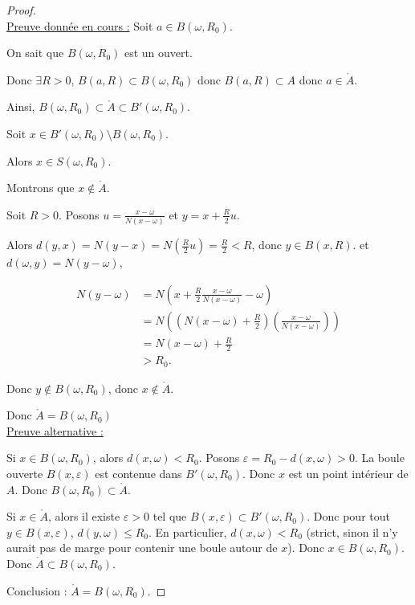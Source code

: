 \begin{proof}~\\
    \uline{Preuve donnée en cours :}
    Soit $a \in B(\omega, R_0)$. 

    On sait que $B(\omega, R_0)$ est un ouvert. 

    Donc $\exists R > 0, \, B(a, R) \subset B(\omega, R_0)$ 
    donc $B(a, R) \subset A$ donc $a \in \mathring{A}$.

    Ainsi, $B(\omega, R_0) \subset \mathring{A} \subset B'(\omega, R_0)$.

    Soit $x \in B'(\omega, R_0) \setminus B(\omega, R_0)$.

    Alors $x \in S(\omega, R_0)$. 

    Montrons que $x \not \in \mathring A$. 

    Soit $R > 0$. Posons $u = \frac{x - \omega}{N(x - \omega)}$ et $y = x + \frac R 2 u$.

    Alors $d(y, x) = N(y - x) = N\left( \frac R 2 u \right) = \frac R 2 < R$, donc $y \in B(x, R)$.
    et $d(\omega, y) = N(y - \omega)$, 

    \begin{align*}
        N(y - \omega) & = N\left(x + \frac R 2 \frac{x - \omega}{N(x - \omega)} - \omega\right) \\
        & = N\left( \left( N(x - \omega) + \frac R 2 \right) \left( \frac{x - \omega}{N(x - \omega)}\right) \right) \\
        & = N(x - \omega) + \frac R 2 \\
        & > R_0.
    \end{align*}

    Donc $y \not \in B(\omega, R_0)$, donc $x \not \in \mathring A$.

    Donc $\mathring A = B(\omega, R_0)$ \\

    \uline{Preuve alternative :}

    Si \( x \in B(\omega, R_0) \), alors \( d(x, \omega) < R_0 \).
    Posons \( \varepsilon = R_0 - d(x, \omega) > 0 \).
    La boule ouverte \( B(x, \varepsilon) \) est contenue dans \( B'(\omega, R_0) \).
    Donc \( x \) est un point intérieur de \( A \).
    Donc \( B(\omega, R_0) \subset \mathring{A} \).

    Si \( x \in \mathring{A} \), alors il existe \( \varepsilon > 0 \) tel que
    \( B(x, \varepsilon) \subset B'(\omega, R_0) \).
    Donc pour tout \( y \in B(x, \varepsilon) \), \( d(y, \omega) \leq R_0 \).
    En particulier, \( d(x, \omega) < R_0 \) (strict, sinon il n'y aurait pas de marge pour contenir une boule autour de \( x \)).
    Donc \( x \in B(\omega, R_0) \).
    Donc \( \mathring{A} \subset B(\omega, R_0) \).

    Conclusion :
    \( \mathring{A} = B(\omega, R_0) \).
\end{proof}


